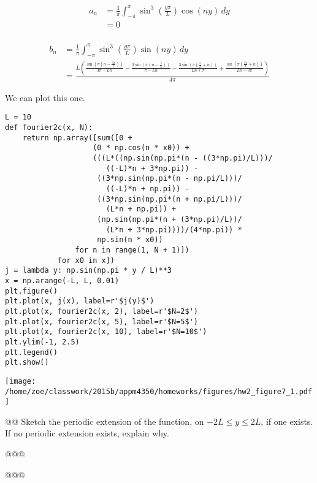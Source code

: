 \documentclass[10pt]{article}
\begin{document}
\begin{easylist}[enumerate]
    \begin{align*}
        a_n &= \frac{1}{\pi} \int_{-\pi}^\pi \sin^3\left(\frac{y\pi}{L}\right) \cos(ny) \, dy\\
        &= 0\\
    \end{align*}

    \begin{align*}
        b_n &= \frac{1}{\pi} \int_{-\pi}^\pi \sin^3\left(\frac{y\pi}{L}\right) \sin(ny) \, dy\\
        &= \frac{L \left(\frac{\sin \left(\pi  \left(n-\frac{3 \pi }{L}\right)\right)}{3 \pi -L n}-\frac{3 \sin \left(\pi \left(n-\frac{\pi }{L}\right)\right)}{\pi -L n}-\frac{3 \sin \left(\pi \left(\frac{\pi }{L}+n\right)\right)}{L n+\pi }+\frac{\sin \left(\pi  \left(\frac{3 \pi }{L}+n\right)\right)}{L n+3 \pi }\right)}{4 \pi }
    \end{align*}

    We can plot this one.

\weave

\begin{verbatim}
L = 10
def fourier2c(x, N):
    return np.array([sum([0 +
                    (0 * np.cos(n * x0)) +
                    (((L*((np.sin(np.pi*(n - ((3*np.pi)/L)))/
                       ((-L)*n + 3*np.pi)) -
                     ((3*np.sin(np.pi*(n - np.pi/L)))/
                       ((-L)*n + np.pi)) -
                     ((3*np.sin(np.pi*(n + np.pi/L)))/
                       (L*n + np.pi)) +
                     (np.sin(np.pi*(n + (3*np.pi)/L))/
                       (L*n + 3*np.pi))))/(4*np.pi)) *
                     np.sin(n * x0))
                for n in range(1, N + 1)])
            for x0 in x])
j = lambda y: np.sin(np.pi * y / L)**3
x = np.arange(-L, L, 0.01)
plt.figure()
plt.plot(x, j(x), label=r'$j(y)$')
plt.plot(x, fourier2c(x, 2), label=r'$N=2$')
plt.plot(x, fourier2c(x, 5), label=r'$N=5$')
plt.plot(x, fourier2c(x, 10), label=r'$N=10$')
plt.ylim(-1, 2.5)
plt.legend()
plt.show()
\end{verbatim}
\texttt{[image: /home/zoe/classwork/2015b/appm4350/homeworks/figures/hw2\_figure7\_1.pdf]}

\noweave

    @@ Sketch the periodic extension of the function, on $-2L \le y \le 2L$, if one exists. If no periodic extension
    exists, explain why.

    @@@
    
    @@@


\end{easylist}
\end{document}
